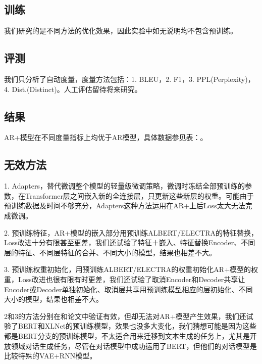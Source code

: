 \documentclass[letterpaper]{article} %
\DeclareRobustCommand{\citeext}[1]{\cite[#1]{#1}}
\begin{document}
\begin{CJK*}{UTF8}{gbsn}
\subsection[Training]{训练}
我们研究的是不同方法的优化效果，因此实验中如无说明均不包含预训练。

\subsection[Evaluation]{评测} 
我们只分析了自动度量，度量方法包括：1. BLEU\citeext{Papineni2002}，2. F1，3. PPL(Perplexity)，4. Dist.(Distinct)\citeext{Li2016}。人工评估留待将来研究。

\subsection[Result]{结果} 
AR+模型在不同度量指标上均优于AR模型，具体数据参见表：。


\subsection[Ineffective Methods]{无效方法} 
1. Adapters\citeext{Houlsby2019}，替代微调整个模型的轻量级微调策略，微调时冻结全部预训练的参数，在Transformer层之间嵌入新的全连接层，只更新这些新层的权重。可能由于预训练数据及时间不够充分，Adapters这种方法运用在AR+上后Loss太大无法完成微调。

2. 预训练特征\citeext{Devlin2019}，AR+模型的嵌入部分用预训练ALBERT\citeext{Lan2019}/ELECTRA\citeext{Clark2020}的特征替换，Loss改进十分有限甚至更差，我们还试验了特征＋嵌入、特征替换Encoder、不同层的特征、不同层特征的合并、不同大小的模型，结果也相差不大。

3. 预训练权重初始化\citeext{Ziegler2019}，用预训练ALBERT/ELECTRA的权重初始化AR+模型的权重，Loss改进也很有限有时更差，我们还试验了取消Encoder和Decoder共享让Encoder或Decoder单独初始化、取消层共享用预训练模型相应的层初始化、不同大小的模型，结果也相差不大。

2和3的方法分别在\citeext{Devlin2019}和\citeext{Zhao2019}论文中验证有效，但却无法对AR+模型产生效果，我们还试验了BERT和XLNet\citeext{Yang2019}的预训练模型，效果也没多大变化，我们猜想可能是因为这些都是BERT分支的预训练模型，不太适合用来迁移到文本生成的任务上，尤其是开放领域对话生成任务，尽管\citeext{Zhao2019}在对话模型中成功运用了BERT，但他们的对话模型是比较特殊的VAE+RNN模型。


\end{CJK*}
\end{document}
